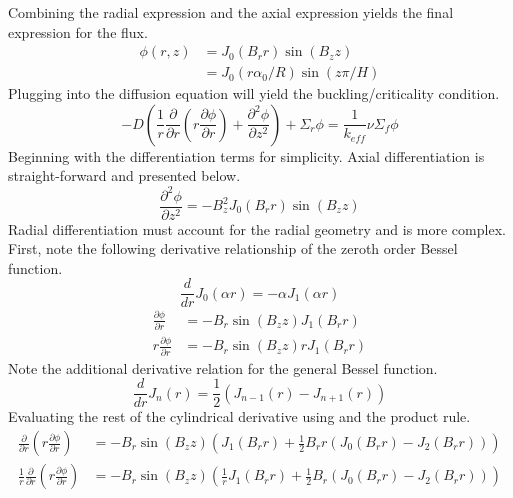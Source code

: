   Combining the radial expression  and the axial 
  expression  yields the final expression for the flux.
  \begin{align} \label{eq:cyl_flux}
    \phi(r,z) &= J_0(B_r r) \sin(B_z z) \\
    &= J_0(r \alpha_0 / R) \sin(z \pi / H)
  \end{align}
  Plugging  into the diffusion equation will yield the 
  buckling/criticality condition.
  \begin{equation}
    -D \left( \frac{1}{r} \frac{\partial}{\partial r} \left( r 
      \frac{\partial \phi}{\partial r} \right) + \frac{\partial^2 \phi}
      {\partial z^2} \right) + \Sigma_r \phi = \frac{1}{k_{eff}} \nu 
      \Sigma_f \phi
  \end{equation}
  Beginning with the differentiation terms for simplicity. Axial 
  differentiation is straight-forward and presented below.
  \begin{equation}
    \frac{\partial^2 \phi}{\partial z^2} = -B_z^2 J_0(B_r r) \sin(B_z z)
  \end{equation}
  Radial differentiation must account for the radial geometry and is more 
  complex. First, note the following derivative relationship of the zeroth
  order Bessel function.
  \begin{equation} \label{eq:deriv_bessel0}
    \frac{d}{dr} J_0(\alpha r) = - \alpha J_1(\alpha r)
  \end{equation}
  \begin{align}
    \frac{\partial \phi}{\partial r} &= -B_r \sin(B_z z) J_1(B_r r) \\
    r \frac{\partial \phi}{\partial r} &= -B_r \sin(B_z z) r J_1 (B_r r) 
  \end{align}
  Note the additional derivative relation for the general Bessel function.
  \begin{equation} \label{eq:deriv_besseln}
    \frac{d}{dr} J_n(r) = \frac{1}{2} \left( J_{n-1}(r) - J_{n+1}(r)\right)
  \end{equation}
  Evaluating the rest of the cylindrical derivative using
   and the product rule.
  \begin{align}
    \frac{\partial}{\partial r} \left( r \frac{\partial \phi}{\partial r}
      \right) &= -B_r \sin(B_z z) \left(J_1(B_r r) + \frac{1}{2} B_r r \left(
      J_0(B_r r) - J_2(B_r r) \right) \right) \\
    \frac{1}{r} \frac{\partial}{\partial r} \left(r 
      \frac{\partial \phi}{\partial r} \right) &=
      -B_r \sin(B_z z) \left(\frac{1}{r} J_1(B_r r) + \frac{1}{2} B_r \left(
      J_0(B_r r) - J_2(B_r r) \right) \right)
  \end{align}
